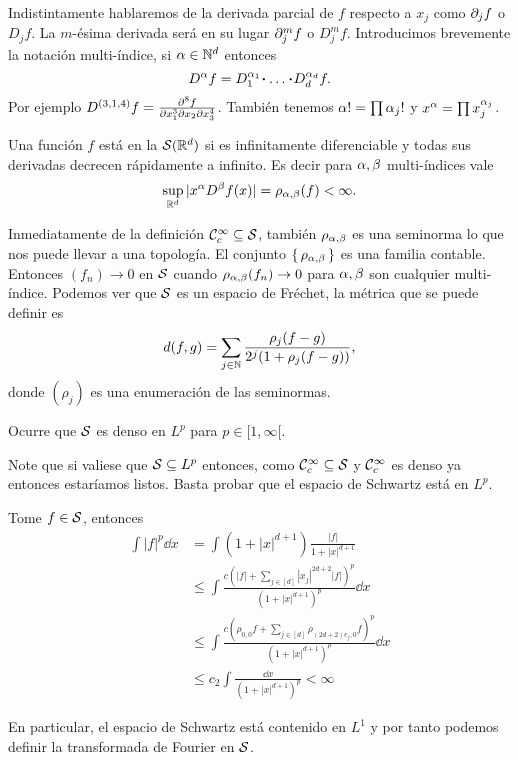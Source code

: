 \documentclass[12pt]{memoir}
\begin{document}
Indistintamente hablaremos de la derivada parcial de $f$ respecto a $x_j$ como $\partial_j f$ o $D_j f$. La $m$-ésima derivada será en su lugar $\partial_j^m f$ o $D_j^m f$. Introducimos brevemente la notación multi-índice, si $\alpha\in\mathbb{N}^d$ entonces
$$D^\al f=D_1^{\al_1}\.\dots\.D_d^{\al_d}f.$$
Por ejemplo $D^{(3,1,4)}f=\frac{\partial^8f}{\partial x_1^3\partial x_2\partial x_3^4}$. También tenemos $\alpha!=\prod\alpha_j!$ y $x^\alpha=\prod x_j^{\alpha_j}$.

\begin{Def}
  Una función $f$ está en la  $\mathcal{S}(\mathbb{R}^d)$ si es infinitamente diferenciable y todas sus derivadas decrecen rápidamente a infinito. Es decir para $\alpha,\beta$ multi-índices vale
  $$\sup_{\mathbb{R}^d}|x^\alpha D^\beta f(x)|=\rho_{\alpha,\beta}(f)<\infty.$$
\end{Def}

Inmediatamente de la definición $\mathcal{C}^\infty_c\subseteq\mathcal{S}$, también $\rho_{\alpha,\beta}$ es una seminorma lo que nos puede llevar a una topología. El conjunto $\{\,\rho_{\alpha,\beta}\,\}$ es una familia contable. Entonces $(f_n)\to 0$ en $\mathcal{S}$ cuando $\rho_{\alpha,\beta}(f_n)\to 0$ para $\alpha,\beta$ son cualquier multi-índice. Podemos ver que $\mathcal{S}$ es un espacio de Fréchet, la métrica que se puede definir es
$$d(f,g)=\sum_{j\in\mathbb{N}}\frac{\rho_j(f-g)}{2^j(1+\rho_j(f-g))},$$
donde $(\rho_j)$ es una enumeración de las seminormas.

\begin{Th}
  Ocurre que $\mathcal{S}$ es denso en $L^p$ para $p\in[1,\infty[$.
\end{Th}

Note que si valiese que $\mathcal{S}\subseteq L^p$ entonces, como $\mathcal{C}^\infty_c\subseteq\mathcal{S}$ y $\mathcal{C}^\infty_c$ es denso ya entonces estaríamos listos. Basta probar que el espacio de Schwartz está en $L^p$.

\begin{ptcbp}
  Tome $f\in\mathcal{S}$, entonces 
  \begin{align*}
    \int|f|^p\dd x&=\int(1+|x|^{d+1})\frac{|f|}{1+|x|^{d+1}}\\
    &\leq \int\frac{c(|f|+\sum_{j\in[d]}|x_j|^{2d+2}|f|)^p}{(1+|x|^{d+1})^p}\dd x\\
    &\leq \int\frac{c(\rho_{0,0}f+\sum_{j\in[d]}\rho_{(2d+2)e_j,0}f)^p}{(1+|x|^{d+1})^p}\dd x\\
    &\leq c_2\int\frac{\dd x}{(1+|x|^{d+1})^p}<\infty
  \end{align*} 
\end{ptcbp}

En particular, el espacio de Schwartz está contenido en $L^1$ y por tanto podemos definir la transformada de Fourier en $\mathcal{S}$.
\end{document}
